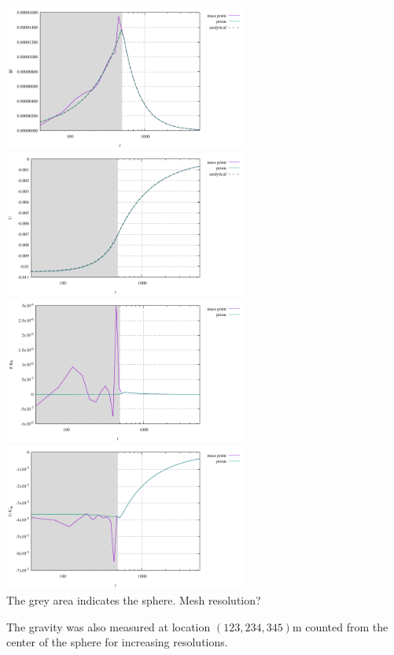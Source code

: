 \begin{center}
\includegraphics[width=8cm]{python_codes/fieldstone_84/sphere/gravnorm}
\includegraphics[width=8cm]{python_codes/fieldstone_84/sphere/gravpot}\\
\includegraphics[width=8cm]{python_codes/fieldstone_84/sphere/gravnorm_error}
\includegraphics[width=8cm]{python_codes/fieldstone_84/sphere/gravpot_error}\\
{\captionfont  The grey area indicates the sphere. Mesh resolution?}
\end{center}

The gravity was also measured at location $(123,234,345)\si{\metre}$ counted from the center of the sphere
for increasing resolutions. 

